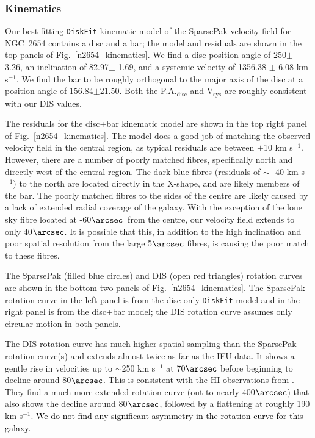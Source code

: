 \documentclass[a4paper,fleqn,usenatbib]{mnras}
\newcommand{\authorfix}{\textcolor{black}}
\begin{document}
\subsubsection{Kinematics}
\label{sec:n2654kine}

Our best-fitting \texttt{DiskFit} kinematic model of the SparsePak velocity field for NGC~2654 contains a disc and a bar; the model and residuals are shown in the top panels of Fig.~\ref{n2654_kinematics}. We find a disc position angle of 250\degr $\pm$ 3.26\degr, an inclination of 82.97\degr $\pm$ 1.69\degr, and a systemic velocity of 1356.38 $\pm$ 6.08 km s$^{-1}$. We find the bar to be roughly orthogonal to the major axis of the disc at a position angle of 156.84\degr$\pm$21.50\degr. Both the P.A.$_{\mathrm{disc}}$ and V$_{\mathrm{sys}}$ are roughly consistent with our DIS values.

The residuals for the disc+bar kinematic model are shown in the top right panel of Fig.~\ref{n2654_kinematics}. The model does a good job of matching the observed velocity field in the central region, as typical residuals are between $\pm$10 km s$^{-1}$. However, there are a number of poorly matched fibres, specifically north and directly west of the central region. The dark blue fibres (residuals of $\sim$ -40 km s$^{-1}$) to the north are located directly in the X-shape, and are likely members of the bar. The poorly matched fibres to the sides of the centre are likely caused by a lack of extended radial coverage of the galaxy. With the exception of the lone sky fibre located at -60$\arcsec$\ from the centre, our velocity field extends to only 40$\arcsec$. It is possible that this, in addition to the high inclination and poor spatial resolution from the large 5$\arcsec$ fibres, is causing the poor match to these fibres.

The SparsePak (filled blue circles) and DIS (open red triangles) rotation curves are shown in the bottom two panels of Fig.~\ref{n2654_kinematics}.  The SparsePak rotation curve in the left panel is from the disc-only \texttt{DiskFit} model and in the right panel is from the disc+bar model; the DIS rotation curve assumes only circular motion in both panels.

The DIS rotation curve has much higher spatial sampling than the SparsePak rotation curve(s) and extends almost twice as far as the IFU data. It shows a gentle rise in velocities up to $\sim$250 km s$^{-1}$ at 70$\arcsec$ before beginning to decline around 80$\arcsec$. This is consistent with the HI observations from \citet{noordermeer2007}. They find a much more extended rotation curve (out to nearly 400$\arcsec$) that also shows the decline around 80$\arcsec$, followed by a flattening at roughly 190 km s$^{-1}$. \authorfix{We do not find any significant asymmetry in the rotation curve for this galaxy.}
\end{document}
